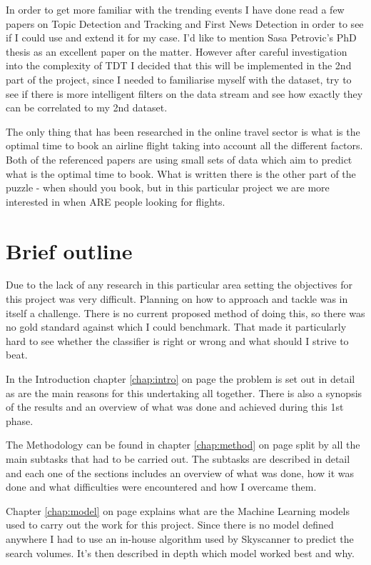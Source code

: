 \documentclass[minf,frontabs,twoside,singlespacing,parskip]{infthesis}
\begin{document}
In order to get more familiar with the trending events I have done read a few papers on Topic Detection and Tracking and First News Detection in order to see if I could use and extend it for my case. I'd like to mention Sasa Petrovic's PhD thesis as an excellent paper on the matter. \cite{Petrovic2012} However after careful investigation into the complexity of TDT I decided that this will be implemented in the 2nd part of the project, since I needed to familiarise myself with the dataset, try to see if there is more intelligent filters on the data stream and see how exactly they can be correlated to my 2nd dataset.


The only thing that has been researched in the online travel sector is what is the optimal time to book an airline flight taking into account all the different factors. \cite{Hamletkdd03} \cite{ijcai} 
Both of the referenced papers are using small sets of data which aim to predict what is the optimal time to book. What is written there is the other part of the puzzle - when should you book, but in this particular project we are more interested in when ARE people looking for flights.

\section{Brief outline}


Due to the lack of any research in this particular area setting the objectives for this project was very difficult. Planning on how to approach and tackle was in itself a challenge. There is no current proposed method of doing this, so there was no gold standard against which I could benchmark. That made it particularly hard to see whether the classifier is right or wrong and what should I strive to beat.


In the Introduction chapter \ref{chap:intro} on page \pageref{chap:intro} the problem is set out in detail as are the main reasons for this undertaking all together. There is also a synopsis of the results and an overview of what was done and achieved during this 1st phase. 


The Methodology can be found in chapter \ref{chap:method} on page \pageref{chap:method} split by all the main subtasks that had to be carried out. The subtasks are described in detail and each one of the sections includes an overview of what was done, how it was done and what difficulties were encountered and how I overcame them. 


Chapter \ref{chap:model} on page \pageref{chap:model} explains what are the Machine Learning models used to carry out the work for this project. Since there is no model defined anywhere I had to use an in-house algorithm used by Skyscanner to predict the search volumes. It's then described in depth which model worked best and why. 
\end{document}
